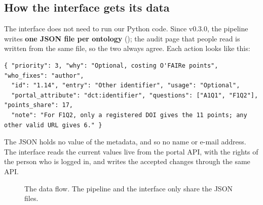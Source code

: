 \documentclass[11pt,a4paper]{article}
\begin{document}
\subsection{How the interface gets its data}

The interface does not need to run our Python code. Since v0.3.0, the pipeline writes \textbf{one JSON
file per ontology} (); the audit page that people read is written from
the same file, so the two always agree. Each action looks like this:

\begin{lstlisting}
{ "priority": 3, "why": "Optional, costing O'FAIRe points", "who_fixes": "author",
  "id": "1.14", "entry": "Other identifier", "usage": "Optional",
  "portal_attribute": "dct:identifier", "questions": ["A1Q1", "F1Q2"], "points_share": 17,
  "note": "For F1Q2, only a registered DOI gives the 11 points; any other valid URL gives 6." }
\end{lstlisting}

The JSON holds no value of the metadata, and so no name or e-mail address. The interface reads the
current values live from the portal API, with the rights of the person who is logged in, and writes
the accepted changes through the same API.

\begin{figure}[H]
\centering
{}
\caption{The data flow. The pipeline and the interface only share the JSON files.}
\label{fig:flow}
\end{figure}
\end{document}

